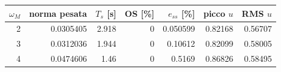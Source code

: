 \begin{center}\small\begin{tabular}{rrrrrrr}\toprule
$\omega_M$ & norma pesata & $T_s$ [s] & OS [\%] & $e_{ss}$ [\%] & picco $u$ & RMS $u$ \\
\midrule
2 & 0.0305405 & 2.918 & 0 & 0.050599 & 0.82168 & 0.56707 \\
3 & 0.0312036 & 1.944 & 0 & 0.10612 & 0.82099 & 0.58005 \\
4 & 0.0474606 & 1.46 & 0 & 0.5169 & 0.86826 & 0.58495 \\
\bottomrule\end{tabular}\end{center}
